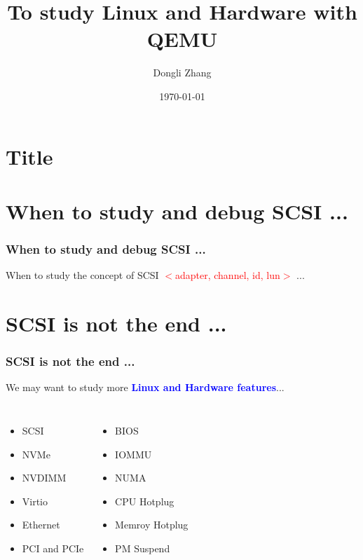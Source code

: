 \documentclass[aspectratio=169]{beamer}
\title[To study Linux and Hardware with QEMU]{To study Linux and Hardware with QEMU}
\author{Dongli Zhang}
\date{\today}
\begin{document}

\section{Title}
\begin{frame}
\titlepage
\end{frame}


\section{When to study and debug SCSI ...}
\begin{frame}
\frametitle{When to study and debug SCSI ...}
\Large When to study the concept of SCSI \textcolor{red}{$<$adapter, channel, id, lun$>$} ...
\begin{itemize}
\end{itemize}
\end{frame}


\section{SCSI is not the end ...}
\begin{frame}
\frametitle{SCSI is not the end ...}
{\LARGE We may want to study more \textbf{\textcolor{blue}{Linux and Hardware features}}...}
\begin{columns}[c]
{ \Large
\begin{itemize}
\item SCSI
\item NVMe
\item NVDIMM
\item Virtio
\item Ethernet
\item PCI and PCIe
\end{itemize}
}
{ \Large
\begin{itemize}
\item BIOS
\item IOMMU
\item NUMA
\item CPU Hotplug
\item Memroy Hotplug
\item PM Suspend
\end{itemize}
}
\end{columns}
\end{frame}
\end{document}
